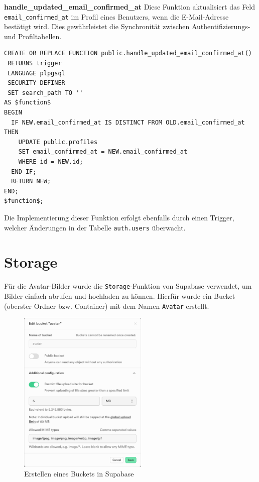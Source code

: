 \begin{inhalt}
\vspace{0.75cm}

\textbf{handle\_updated\_email\_confirmed\_at}
Diese Funktion aktualisiert das Feld \texttt{email\_confirmed\_at} im Profil eines Benutzers, wenn die E-Mail-Adresse bestätigt wird. Dies gewährleistet die Synchronität zwischen Authentifizierungs- und Profiltabellen.

\begin{lstlisting}[style=mysql]
CREATE OR REPLACE FUNCTION public.handle_updated_email_confirmed_at()
 RETURNS trigger
 LANGUAGE plpgsql
 SECURITY DEFINER
 SET search_path TO ''
AS $function$
BEGIN
  IF NEW.email_confirmed_at IS DISTINCT FROM OLD.email_confirmed_at THEN
    UPDATE public.profiles
    SET email_confirmed_at = NEW.email_confirmed_at
    WHERE id = NEW.id;
  END IF;
  RETURN NEW;
END;
$function$;
\end{lstlisting}

Die Implementierung dieser Funktion erfolgt ebenfalls durch einen Trigger, welcher Änderungen in der Tabelle \texttt{auth.users} überwacht.

\newpage

\section{Storage}

Für die Avatar-Bilder wurde die \texttt{Storage}-Funktion von Supabase verwendet, um Bilder einfach abrufen und hochladen zu können.  
Hierfür wurde ein Bucket (oberster Ordner bzw. Container) mit dem Namen \texttt{Avatar} erstellt.

\begin{figure}[!htb]
\centering
\includegraphics[width=0.55\textwidth]{files/Thomas/pics/Datenbank/storage/supabase_bucket_create.png}
\caption[Erstellen eines Buckets in Supabase]{Erstellen eines Buckets in Supabase}
\label{fig:supabase_bucket_create}
\end{figure}


\end{inhalt}
